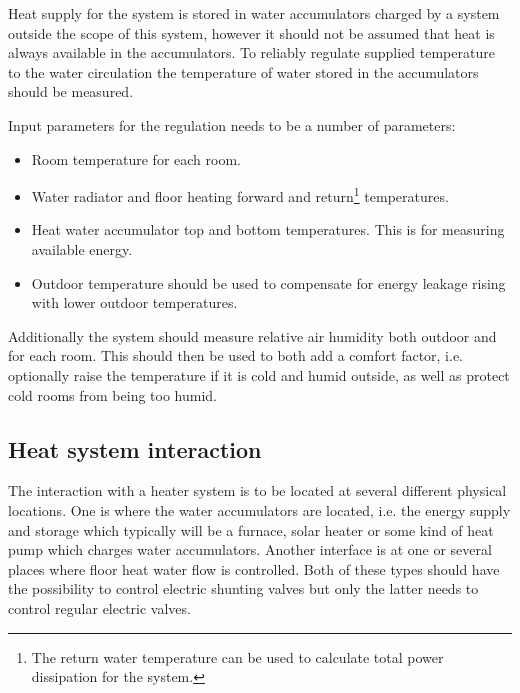 Heat supply for the system is stored in water accumulators charged by
a system outside the scope of this system, however it should not be
assumed that heat is always available in the accumulators. To reliably
regulate supplied temperature to the water circulation the temperature
of water stored in the accumulators should be measured. 

Input parameters for the regulation needs to be a number of
parameters:
\begin{itemize}
\item{Room temperature for each room.}
\item{Water radiator and floor heating forward and
  return\footnote{The return water temperature can be used to
    calculate total power dissipation for the system.} temperatures.}
\item{Heat water accumulator top and bottom temperatures. This is for
  measuring available energy.}
\item{Outdoor temperature should be used to compensate for energy
  leakage rising with lower outdoor temperatures.}
\end{itemize}
Additionally the system should measure relative air humidity both
outdoor and for each room. This should then be used to both add a
comfort factor, i.e. optionally raise the temperature if it is cold
and humid outside, as well as protect cold rooms from being too
humid. 


\subsection{Heat system interaction}
The interaction with a heater system is to be located at several
different physical locations. One is where the water accumulators are
located, i.e. the energy supply and storage which typically will be a
furnace, solar heater or some kind of heat pump which charges water
accumulators. Another interface is at one or several places where
floor heat water flow is controlled. Both of these types should have
the possibility to control electric shunting valves but only the
latter needs to control regular electric valves.

